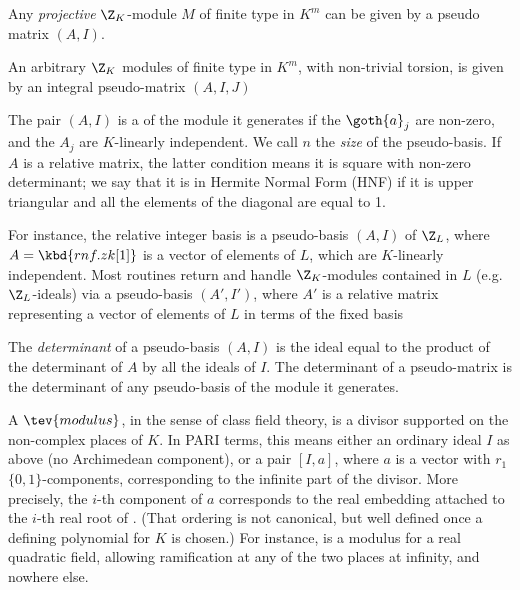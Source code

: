 \item Any \emph{projective} $\Z_K$-module $M$
of finite type in $K^m$ can be given by a pseudo matrix $(A,I)$.

\item An arbitrary $\Z_K$ modules of finite type in $K^m$, with non-trivial
torsion, is given by an integral pseudo-matrix $(A,I,J)$


\item The pair $(A,I)$ is a  of the module it
generates if the $\goth{a}_j$ are non-zero, and the $A_j$ are $K$-linearly
independent. We call $n$ the \emph{size} of the pseudo-basis. If $A$ is a
relative matrix, the latter condition means it is square with non-zero
determinant; we say that it is in Hermite Normal
Form (HNF) if it is upper triangular and all the
elements of the diagonal are equal to 1.

\item For instance, the relative integer basis  is a pseudo-basis
$(A,I)$ of $\Z_L$, where $A = \kbd{rnf.zk[1]}$ is a vector of elements of $L$,
which are $K$-linearly independent. Most  routines return and handle
$\Z_K$-modules contained in $L$ (e.g.~$\Z_L$-ideals) via a pseudo-basis
$(A',I')$, where $A'$ is a relative matrix representing a vector of elements of
$L$ in terms of the fixed basis 

\item The \emph{determinant} of a pseudo-basis $(A,I)$ is the ideal
equal to the product of the determinant of $A$ by all the ideals of $I$. The
determinant of a pseudo-matrix is the determinant of any pseudo-basis of the
module it generates.

\label{se:CFT}

A $\tev{modulus}$, in the sense of class field theory, is a divisor supported
on the non-complex places of $K$. In PARI terms, this means either an
ordinary ideal $I$ as above (no Archimedean component), or a pair $[I,a]$,
where $a$ is a vector with $r_1$ $\{0,1\}$-components, corresponding to the
infinite part of the divisor. More precisely, the $i$-th component of $a$
corresponds to the real embedding attached to the $i$-th real root of
. (That ordering is not canonical, but well defined once a
defining polynomial for $K$ is chosen.) For instance, \kbd{[1, [1,1]]} is a
modulus for a real quadratic field, allowing ramification at any of the two
places at infinity, and nowhere else.

